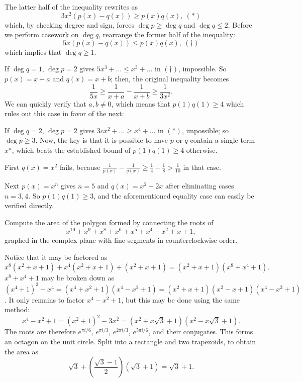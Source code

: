 \documentclass[11pt]{article}
\theoremstyle{definition}
\begin{document}
\begin{solution}[name={Solution by peace09}]
	The latter half of the inequality rewrites as
	\[3x^2(p(x)-q(x))\ge p(x)q(x),~(\ast)\]which, by checking degree and sign, forces $\deg p\ge\deg q$ and $\deg q\le 2$. Before we perform casework on $\deg q$, rearrange the former half of the inequality:
	\[5x(p(x)-q(x))\le p(x)q(x),~(\dagger)\]which implies that $\deg q\ge 1$.
	
	If $\deg q=1$, $\deg p=2$ gives $5x^3+\dots\le x^3+\dots$ in $(\dagger)$, impossible. So $p(x)=x+a$ and $q(x)=x+b$; then, the original inequality becomes
	\[\frac{1}{5x}\ge\frac{1}{x+a}-\frac{1}{x+b}\ge\frac{1}{3x^2}.\]We can quickly verify that $a,b\neq0$, which means that $p(1)q(1)\ge4$ which rules out this case in favor of the next:
	
	If $\deg q=2$, $\deg p=2$ gives $3cx^2+\dots\ge x^4+\dots$ in $(\ast)$, impossible; so $\deg p\ge 3$. Now, the key is that it is possible to have $p$ or $q$ contain a single term $x^n$, which beats the established bound of $p(1)q(1)\ge4$ otherwise.
	
	First $q(x)=x^2$ fails, because $\tfrac{1}{p(x)}-\tfrac{1}{q(x)}\ge\tfrac{1}{4}-\tfrac{1}{8}>\tfrac{1}{10}$ in that case.
	
	Next $p(x)=x^n$ gives $n=5$ and $q(x)=x^2+2x$ after eliminating cases $n=3,4$. So $p(1)q(1)\ge\boxed{3}$, and the aforementioned equality case can easily be verified directly.
\end{solution}




\begin{question}[name={2023 Stanford Math Tournament, \href{https://artofproblemsolving.com/community/c383h3065230p27653938}{Algebra Tiebreaker \#1}}]
	Compute the area of the polygon formed by connecting the roots of
	\[x^{10} + x^9 + x^8 + x^6 + x^5 + x^4 + x^2 + x + 1,\]graphed in the complex plane with line segments in counterclockwise order.
\end{question}

\begin{solution}[name={Solution by gracemoon124}]
	Notice that it may be factored as
	\[x^8(x^2+x+1)+x^4(x^2+x+1)+(x^2+x+1)=(x^2+x+1)(x^8+x^4+1).\]$x^8+x^4+1$ may be broken down as $(x^4+1)^2-x^4=(x^4+x^2+1)(x^4-x^2+1)=(x^2+x+1)(x^2-x+1)(x^4-x^2+1)$.
	It only remains to factor $x^4-x^2+1$, but this may be done using the same method:
	\[x^4-x^2+1=(x^2+1)^2-3x^2=(x^2+x\sqrt{3}+1)(x^2-x\sqrt{3}+1).\]The roots are therefore $e^{\pi i/6}$, $e^{\pi i/3}$, $e^{2\pi i/3}$, $e^{5\pi i/6}$, and their conjugates.
	This forms an octagon on the unit circle.
	Split into a rectangle and two trapezoids, to obtain the area as
	\[\sqrt{3}+\left(\frac{\sqrt{3}-1}{2}\right)(\sqrt{3}+1)=\boxed{\sqrt{3}+1}.\]
\end{solution}
\end{document}
